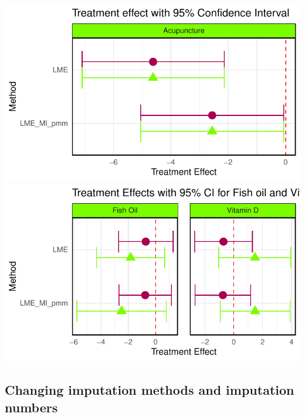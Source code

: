 \documentclass{article}
\newcommand{\pandocbounded}[1]{#1}
\begin{document}
\pandocbounded{\includegraphics[keepaspectratio]{Final_Report_files/figure-latex/unnamed-chunk-20-1.pdf}}
\pandocbounded{\includegraphics[keepaspectratio]{Final_Report_files/figure-latex/unnamed-chunk-20-2.pdf}}

\subsection{Changing imputation methods and imputation
numbers}\label{changing-imputation-methods-and-imputation-numbers}
\end{document}
